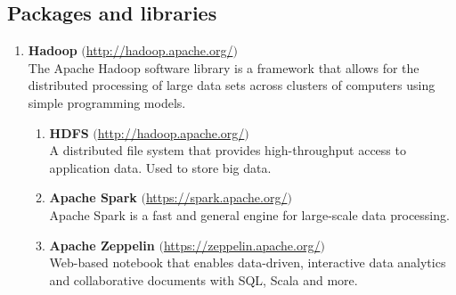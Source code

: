 \subsection{Packages and libraries}

\begin{enumerate}
    \item \textbf{Hadoop} $($\url{http://hadoop.apache.org/}$)$ \\
    The Apache Hadoop software library is a framework that allows for the distributed processing of large data sets across clusters of computers using simple programming models. 
    \begin{enumerate}
        \item \textbf{HDFS} $($\url{http://hadoop.apache.org/}$)$ \\
        A distributed file system that provides high-throughput access to application data. Used to store big data.
        \item \textbf{Apache Spark} $($\url{https://spark.apache.org/}$)$\\
        Apache Spark is a fast and general engine for large-scale data processing.
        \item \textbf{Apache Zeppelin} $($\url{https://zeppelin.apache.org/}$)$ \\
         Web-based notebook that enables data-driven, interactive data analytics and collaborative documents with SQL, Scala and more.
    \end{enumerate}
    

\end{enumerate}
